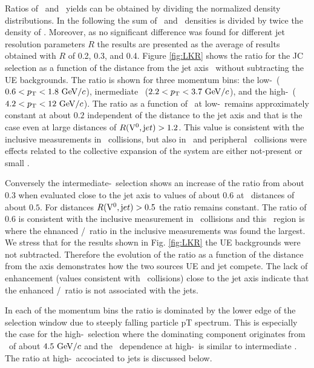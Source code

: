 Ratios of \lda\ and \ks\ yields can be obtained by dividing the normalized density distributions. In the following the sum of \lda\ and \alda\ densities is divided by twice the density of \ks. 
Moreover, as no significant difference was found for different jet resolution parameters $R$ the results are presented as the average of results obtained with $R$ of 0.2, 0.3, and 0.4. 
Figure \ref{fig:LKR} shows the ratio for the JC selection as a function of the distance from the jet axis \rvzerojet\ without subtracting the UE backgrounds. 
The ratio is shown for three momentum bins: the low-\pt\ ($0.6 <p_{\mathrm{T}} <1.8~\mathrm{GeV}/c$), inermediate \pt\ ($2.2 < p_{\mathrm{T}} < 3.7~\mathrm{GeV}/c$), and the high-\pt\ ($4.2 < p_{\mathrm{T}} < 12~\mathrm{GeV}/c$). 
The ratio as a function of \rvzerojet\ at low-\pt\ remains approximately constant at about $0.2$ independent of the distance to the jet axis and that is the case even at large distances of $R({\rm V}^0,{\mathrm jet}) > 1.2$. 
This value is consistent with the inclusive measurements in \pPb\ collisions, but also in \pp\ and peripheral \PbPb\ collisions were effects related to the collective expansion of the system are either not-present or small \cite{Abelev:2014uua}.

Conversely the intermediate-\pt\ selection shows an increase of the ratio from about $0.3$ when evaluated close to the jet axis to values of about $0.6$ at \rvzerojet\ distances of about $0.5$.
For distances $R({\rm V}^0,{\mathrm jet}) > 0.5$ the ratio remains constant.
The ratio of $0.6$ is consistent with the inclusive measurement in \pPb\ collisions \cite{Abelev:2013haa} and this \pt\ region is where the ehnanced \lda/\ks\ ratio in the inclusive measurements was found the largest.
We stress that for the results shown in Fig. \ref{fig:LKR} the UE backgrounds were not subtracted.
Therefore the evolution of the ratio as a function of the distance from the axis demonstrates how the two sources UE and jet compete.
The lack of enhancement (values consistent with \pp\ collisions) close to the jet axis indicate that the enhanced \lda/\ks\ ratio is not associated with the jets.

In each of the momentum bins the ratio is dominated by the lower edge of the selection window due to steeply falling particle pT spectrum. 
This is especially the case for the high-\pt\ selection where the dominating component originates from \pt\ of about $4.5~\mathrm{GeV}/c$ and the \rvzerojet\ dependence at high-\pt\ is similar to intermediate \pt. The ratio at high-\pt\ accociated to jets is discussed below.

